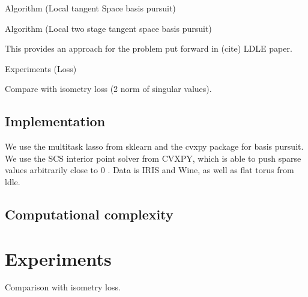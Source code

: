 Algorithm (Local tangent Space basis pursuit)

Algorithm (Local two stage tangent space basis pursuit)

This provides an approach for the problem put forward in (cite) LDLE paper.

Experiments (Loss)

Compare with isometry loss (2 norm of singular values).

\subsection{Implementation}

We use the multitask lasso from sklearn and the cvxpy package for basis pursuit.  We use the SCS interior point solver from CVXPY, which is able to push sparse values arbitrarily close to 0 \cite{cvxpy_sparse_solution}. Data is IRIS and Wine, as well as flat torus from ldle.
\subsection{Computational complexity}
\section{Experiments}

Comparison with isometry loss.